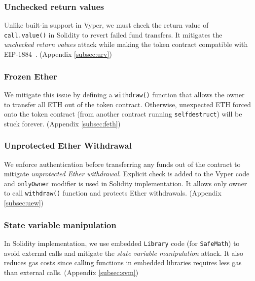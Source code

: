 \subsubsection{Unchecked return values}
Unlike built-in support in Vyper, we must check the return value of \texttt{call.value()} in Solidity to revert failed fund transfers. It mitigates the \textit{unchecked return values} attack while making the token contract compatible with EIP-1884~\cite{EIP1884}. (\cf Appendix \ref{subsec:urv})

\subsubsection{Frozen Ether}
We mitigate this issue by defining a \texttt{withdraw()} function that allows the owner to transfer all ETH out of the token contract. Otherwise, unexpected ETH forced onto the token contract (\eg from another contract running \texttt{selfdestruct}) will be stuck forever. (\cf Appendix \ref{subsec:feth})

\subsubsection{Unprotected Ether Withdrawal}
We enforce authentication before transferring any funds out of the contract to mitigate \textit{unprotected Ether withdrawal}. Explicit check is added to the Vyper code and \texttt{onlyOwner} modifier is used in Solidity implementation. It allows only owner to call \texttt{withdraw()} function and protects Ether withdrawals. (\cf Appendix \ref{subsec:uew})

\subsubsection{State variable manipulation}
In Solidity implementation, we use embedded \texttt{Library} code (for \texttt{SafeMath}) to avoid external calls and mitigate the \textit{state variable manipulation} attack. It also reduces gas costs since calling functions in embedded libraries requires less gas than external calls. (\cf Appendix \ref{subsec:svm})
	


